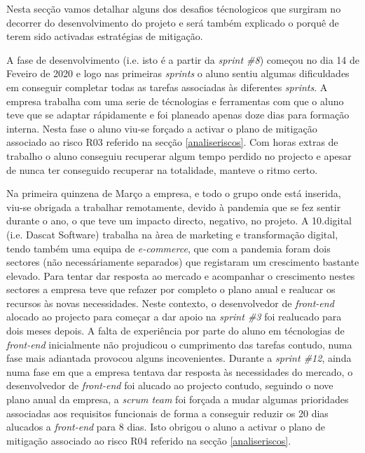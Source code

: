 Nesta secção vamos detalhar alguns dos desafios técnologicos que surgiram no decorrer do desenvolvimento do projeto e será também explicado o porquê de terem sido activadas estratégias de mitigação.

A fase de desenvolvimento (i.e. isto é a partir da \textit{sprint \#8}) começou no dia 14 de Feveiro de 2020 e logo nas primeiras \textit{sprints} o aluno sentiu algumas dificuldades em conseguir completar todas as tarefas associadas às diferentes \textit{sprints}. A empresa trabalha com uma serie de técnologias e ferramentas com que o aluno teve que se adaptar rápidamente e foi planeado apenas doze dias para formação interna. Nesta fase o aluno viu-se forçado a activar o plano de mitigação associado ao risco R03 referido na secção \ref{analiseriscos}. Com horas extras de trabalho o aluno conseguiu recuperar algum tempo perdido no projecto e apesar de nunca ter conseguido recuperar na totalidade, manteve o ritmo certo.

Na primeira quinzena de Março a empresa, e todo o grupo onde está inserida, viu-se obrigada a trabalhar remotamente, devido à pandemia que se fez sentir durante o ano, o que teve um impacto directo, negativo, no projeto. A 10.digital (i.e. Dascat Software) trabalha na àrea de marketing e transformação digital, tendo também uma equipa de \textit{e-commerce}, que com a pandemia foram dois sectores (não necessáriamente separados) que registaram um crescimento bastante elevado. 
Para tentar dar resposta ao mercado e acompanhar o crescimento nestes sectores a empresa teve que refazer por completo o plano anual e realucar os recursos às novas necessidades. 
Neste contexto, o desenvolvedor de \textit{front-end} alocado ao projecto para começar a dar apoio na \textit{sprint \#3} foi realucado para dois meses depois. A falta de experiência por parte do aluno em técnologias de \textit{front-end} inicialmente não projudicou o cumprimento das tarefas contudo, numa fase mais adiantada provocou alguns incovenientes. 
Durante a \textit{sprint \#12}, ainda numa fase em que a empresa tentava dar resposta às necessidades do mercado, o desenvolvedor de \textit{front-end} foi alucado ao projecto contudo, seguindo o nove plano anual da empresa, a \textit{scrum team} foi forçada a mudar algumas prioridades associadas aos requisitos funcionais de forma a conseguir reduzir os 20 dias alucados a \textit{front-end} para 8 dias. Isto obrigou o aluno a activar o plano de mitigação associado ao risco R04 referido na secção \ref{analiseriscos}. 

